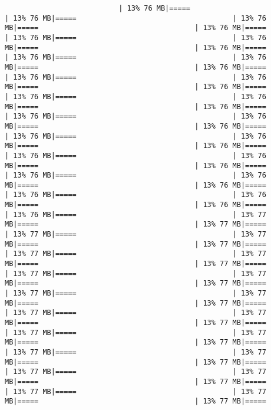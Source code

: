 \documentclass[
]{article}
\begin{document}
\begin{verbatim}
                           | 13% 76 MB|=====                                     | 13% 76 MB|=====                                     | 13% 76 MB|=====                                     | 13% 76 MB|=====                                     | 13% 76 MB|=====                                     | 13% 76 MB|=====                                     | 13% 76 MB|=====                                     | 13% 76 MB|=====                                     | 13% 76 MB|=====                                     | 13% 76 MB|=====                                     | 13% 76 MB|=====                                     | 13% 76 MB|=====                                     | 13% 76 MB|=====                                     | 13% 76 MB|=====                                     | 13% 76 MB|=====                                     | 13% 76 MB|=====                                     | 13% 76 MB|=====                                     | 13% 76 MB|=====                                     | 13% 76 MB|=====                                     | 13% 76 MB|=====                                     | 13% 76 MB|=====                                     | 13% 76 MB|=====                                     | 13% 76 MB|=====                                     | 13% 76 MB|=====                                     | 13% 76 MB|=====                                     | 13% 76 MB|=====                                     | 13% 76 MB|=====                                     | 13% 76 MB|=====                                     | 13% 76 MB|=====                                     | 13% 76 MB|=====                                     | 13% 76 MB|=====                                     | 13% 76 MB|=====                                     | 13% 77 MB|=====                                     | 13% 77 MB|=====                                     | 13% 77 MB|=====                                     | 13% 77 MB|=====                                     | 13% 77 MB|=====                                     | 13% 77 MB|=====                                     | 13% 77 MB|=====                                     | 13% 77 MB|=====                                     | 13% 77 MB|=====                                     | 13% 77 MB|=====                                     | 13% 77 MB|=====                                     | 13% 77 MB|=====                                     | 13% 77 MB|=====                                     | 13% 77 MB|=====                                     | 13% 77 MB|=====                                     | 13% 77 MB|=====                                     | 13% 77 MB|=====                                     | 13% 77 MB|=====                                     | 13% 77 MB|=====                                     | 13% 77 MB|=====                                     | 13% 77 MB|=====                                     | 13% 77 MB|=====                                     | 13% 77 MB|=====                                     | 13% 77 MB|=====                                     | 13% 77 MB|=====                                     | 13% 77 MB|=====                                     | 13% 77 MB|=====                                     | 13% 77 MB|=====                                     | 13% 77 MB|=====                                   
\end{verbatim}
\end{document}
